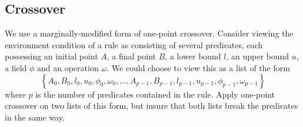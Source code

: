 \subsection{Crossover}
\label{sec:crossover}
We use a marginally-modified form of one-point crossover.
Consider viewing the environment condition of a rule as consisting of several predicates, each possessing an initial point $A$, a final point $B$, a lower bound $l$, an upper bound $u$, a field $\phi$ and an operation $\omega$.
We could choose to view this as a list of the form
\begin{equation}
\left\{
   A_0, B_0, l_0, u_0, \phi_0, \omega_0,
   \ldots,
   A_{p-1}, B_{p-1}, l_{p-1}, u_{p-1}, \phi_{p-1}, \omega_{p-1}
\right\}
\end{equation}
where $p$ is the number of predicates contained in the rule.
Apply one-point crossover on two lists of this form, but insure that both lists break the predicates in the same way.


